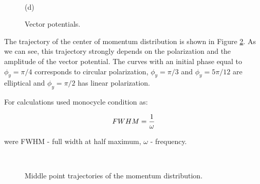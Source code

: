 \begin{figure}[h!]
\begin{minipage}[h]{0.5\linewidth}
\end{minipage}
\hfill
\begin{minipage}[h]{0.5\linewidth}
 \\(d)
\end{minipage}
\caption{Vector potentials.}
\label{fig:Pulses_3}
\end{figure}


The trajectory of the center of momentum distribution is shown in Figure \ref{fig:Pulse_p_3}. As we can see, this trajectory strongly depends on the polarization and the amplitude of the vector potential. The curves with an initial phase equal to $\phi_y=\pi /4$ corresponds to circular polarization, $\phi_y=\pi /3$ and $\phi_y=5\pi /12$ are elliptical and $\phi_y=\pi /2$ has linear polarization.

For calculations used monocycle condition as:

\begin{equation}
FWHM={1 \over \omega}\\
\label{eq:monocycle_condition}
\end{equation}

were FWHM - full width at half maximum, $\omega$ - frequency.

\begin{figure}[h!]
 \\
\caption{Middle point trajectories of the momentum distribution.}
\label{fig:Pulse_p_3}
\end{figure}

